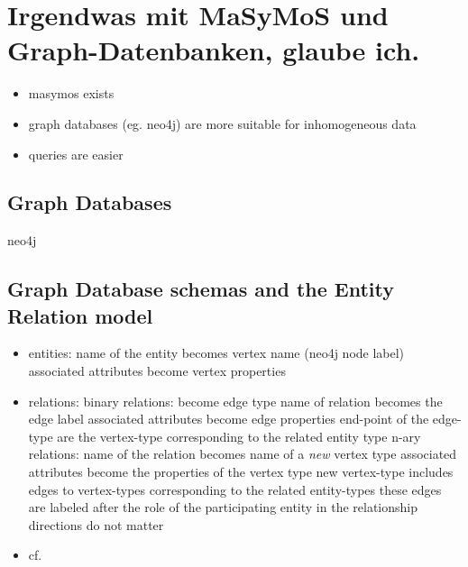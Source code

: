 \section{Irgendwas mit MaSyMoS und Graph-Datenbanken, glaube ich.}
	\begin{itemize}
		\item masymos exists
		\item graph databases (eg. neo4j) are more suitable for inhomogeneous data
		\item queries are easier
	\end{itemize}
	
	\subsection{Graph Databases}
	neo4j
	
	\subsection{Graph Database schemas and the Entity Relation model}
	\begin{itemize}
	\item entities:
		\subitem name of the entity becomes vertex name (neo4j node label)
		\subitem associated attributes become vertex properties
	\item relations:
		\subitem binary relations:
			\subsubitem become edge type
			\subsubitem name of relation becomes the edge label
			\subsubitem associated attributes become edge properties
			\subsubitem end-point of the edge-type are the vertex-type corresponding to the related entity type
		\subitem n-ary relations:
			\subsubitem name of the relation becomes name of a \emph{new} vertex type
			\subsubitem associated attributes become the properties of the vertex type
			\subsubitem new vertex-type includes edges to vertex-types corresponding to the related entity-types
			\subsubitem these edges are labeled after the role of the participating entity in the relationship
			\subsubitem directions do not matter
	\item cf. \cite{Siriwaradhana2014}
	\end{itemize}
	
